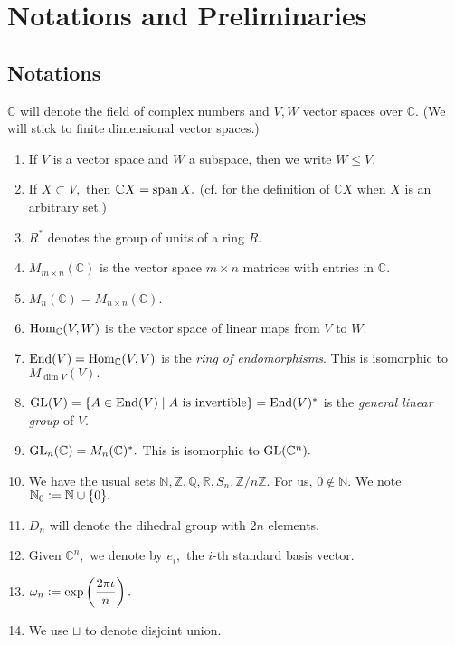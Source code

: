 \section{Notations and Preliminaries} \label{sec:00}
\setcounter{subsection}{-1}
\subsection{Notations} \label{subsec:notations}
$\mathbb{C}$ will denote the field of complex numbers and $V, W$ vector spaces over $\mathbb{C}.$ (We will stick to finite dimensional vector spaces.)

\begin{enumerate}
	\item If $V$ is a vector space and $W$ a subspace, then we write $W \le V.$
	\item If $X \subset V,$ then $\mathbb{C}X = \operatorname{span} X.$ (cf.  for the definition of $\mathbb{C}X$ when $X$ is an arbitrary set.)
	\item $R^*$ denotes the group of units of a ring $R.$
	\item $M_{m \times n}(\mathbb{C})$ is the vector space $m \times n$ matrices with entries in $\mathbb{C}.$
	\item $M_n(\mathbb{C}) = M_{n \times n}(\mathbb{C}).$
	\item $\operatorname{Hom}_{\mathbb{C}}(V, W)$ is the vector space of linear maps from $V$ to $W.$
	\item $\operatorname{End}(V) = \operatorname{Hom}_{\mathbb{C}}(V, V)$ is the \emph{ring of endomorphisms}. This is isomorphic to $M_{\dim V}(V).$
	\item $\operatorname{GL}(V) = \{A \in \operatorname{End}(V) \mid A \text{ is invertible}\} = \operatorname{End}(V)^*$ is the \emph{general linear group} of $V.$
	\item $\operatorname{GL}_n(\mathbb{C}) = M_n(\mathbb{C})^*.$ This is isomorphic to $\operatorname{GL}(\mathbb{C}^n).$
	\item We have the usual sets $\mathbb{N}, \mathbb{Z}, \mathbb{Q}, \mathbb{R}, S_n, \mathbb{Z}/n\mathbb{Z}.$ For us, $0 \notin \mathbb{N}.$ We note $\mathbb{N}_0 \vcentcolon= \mathbb{N} \cup \{0\}.$
	\item $D_n$ will denote the dihedral group with $2n$ elements. 
	\item Given $\mathbb{C}^n,$ we denote by $e_i,$ the $i$-th standard basis vector.
	\item $\omega_n \vcentcolon= \exp\left(\dfrac{2\pi\iota}{n}\right).$
	\item We use $\sqcup$ to denote disjoint union.
\end{enumerate}

